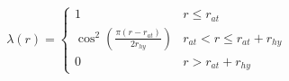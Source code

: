\documentclass[12pt]{article}
\begin{document}
\begin{eqnarray*}
\lambda(r)=\left\{
\begin{array}{ll}
1 & r \leq r_{at}\\
\cos^2\left(\frac{\pi(r-r_{at})}{2r_{hy}}\right) & r_{at}< r \leq r_{at}+r_{hy}\\
0 & r > r_{at}+r_{hy}
\end{array}
\right.
\end{eqnarray*}
\end{document}
